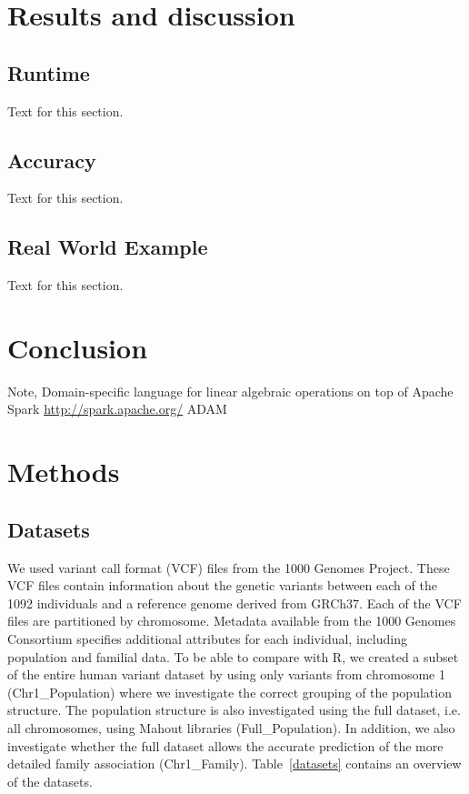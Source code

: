 \documentclass[twocolumn]{bmcart}%
\newcommand{\chrOnePop}{Chr1\_Population}
\newcommand{\FullPop}{Full\_Population}
\newcommand{\FullFam}{Chr1\_Family}
\begin{document}







\section*{Results and discussion}
\subsection*{Runtime}
Text for this section.

\subsection*{Accuracy}
Text for this section.

\subsection*{Real World Example}
Text for this section.

\section*{Conclusion}
Note,  Domain-specific language for linear algebraic operations on top of Apache Spark \url{http://spark.apache.org/}
ADAM~\cite{Massie2013}


\section*{Methods}
\subsection*{Datasets}
We used variant call format (VCF) files from the 1000 Genomes Project.
These VCF files contain information about the genetic variants between each of the 1092 individuals and a reference genome derived from GRCh37. 
Each of the VCF files are partitioned by chromosome.
Metadata available from the 1000 Genomes Consortium specifies additional attributes for each individual, including population and familial data.
To be able to compare with R, we created a subset of the entire human variant dataset by using only variants from chromosome 1 (\chrOnePop) where we investigate the correct grouping of the population structure. 
The population structure is also investigated using the full dataset, i.e. all chromosomes, using Mahout libraries (\FullPop). 
In addition, we also investigate whether the full dataset allows the accurate prediction of the more detailed family association (\FullFam).
Table~\ref{datasets} contains an overview of the datasets.
\end{document}
